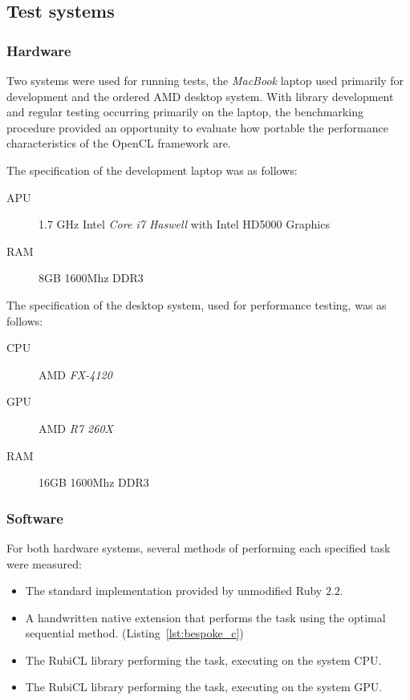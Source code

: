 \subsection{Test systems}
\subsubsection{Hardware}
Two systems were used for running tests, the \emph{MacBook} laptop used primarily for development and the ordered \ac{AMD} desktop system.
With library development and regular testing occurring primarily on the laptop, the benchmarking procedure provided an opportunity to evaluate how portable the performance characteristics of the \ac{OpenCL} framework are.

The specification of the development laptop was as follows:
\begin{description}
  \item[APU] 1.7 GHz Intel \emph{Core i7 Haswell} with Intel HD5000 Graphics
  \item[RAM] 8GB 1600Mhz DDR3
\end{description}

The specification of the desktop system, used for performance testing, was as follows:
\begin{description}
  \item[CPU] AMD \emph{FX-4120}
  \item[GPU] AMD \emph{R7 260X}
  \item[RAM] 16GB 1600Mhz DDR3
\end{description}

\subsubsection{Software}
For both hardware systems, several methods of performing each specified task were measured:
\begin{itemize}
    \item The standard implementation provided by unmodified Ruby $2.2$.
    \item A handwritten native extension that performs the task using the optimal sequential method. (Listing~\ref{lst:bespoke_c})
    \item The RubiCL library performing the task, executing on the system \ac{CPU}.
    \item The RubiCL library performing the task, executing on the system \ac{GPU}.
\end{itemize}

